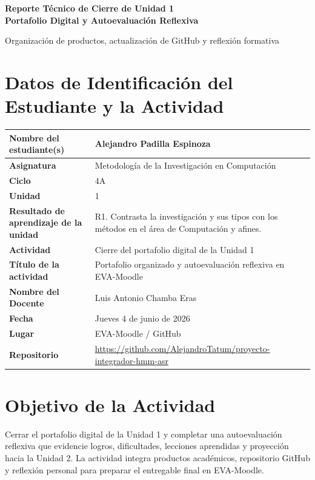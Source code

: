 \documentclass[11pt,a4paper]{article}
\begin{document}
\begin{center}
{\bfseries\fontsize{22}{25}\selectfont
Reporte Técnico de Cierre de Unidad 1\\
Portafolio Digital y Autoevaluación Reflexiva\par}
\vspace{0.25cm}
{\large Organización de productos, actualización de GitHub y reflexión formativa\par}
\end{center}

\section{Datos de Identificación del Estudiante y la Actividad}

\begin{tabularx}{\textwidth}{|L{0.43\textwidth}|Y|}
\hline
\textbf{Nombre del estudiante(s)} & Alejandro Padilla Espinoza \\ \hline
\textbf{Asignatura} & Metodología de la Investigación en Computación \\ \hline
\textbf{Ciclo} & 4A \\ \hline
\textbf{Unidad} & 1 \\ \hline
\textbf{Resultado de aprendizaje de la unidad} & R1. Contrasta la investigación y sus tipos con los métodos en el área de Computación y afines. \\ \hline
\textbf{Actividad} & Cierre del portafolio digital de la Unidad 1 \\ \hline
\textbf{Título de la actividad} & Portafolio organizado y autoevaluación reflexiva en EVA-Moodle \\ \hline
\textbf{Nombre del Docente} & Luis Antonio Chamba Eras \\ \hline
\textbf{Fecha} & Jueves 4 de junio de 2026 \\ \hline
\textbf{Lugar} & EVA-Moodle / GitHub \\ \hline
\textbf{Repositorio} & \url{https://github.com/AlejandroTatum/proyecto-integrador-hmm-asr} \\ \hline
\end{tabularx}

\section{Objetivo de la Actividad}

Cerrar el portafolio digital de la Unidad 1 y completar una autoevaluación reflexiva que evidencie logros, dificultades, lecciones aprendidas y proyección hacia la Unidad 2. La actividad integra productos académicos, repositorio GitHub y reflexión personal para preparar el entregable final en EVA-Moodle.
\end{document}

